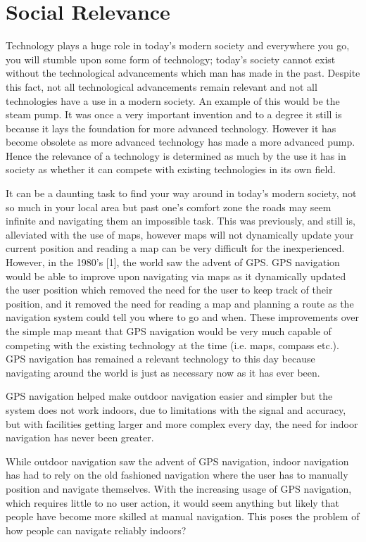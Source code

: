 \section{Social Relevance}
Technology plays a huge role in today's modern society and everywhere you go, you will stumble upon some form of technology; today's society cannot exist without the technological advancements which man has made in the past.
Despite this fact, not all technological advancements remain relevant and not all technologies have a use in a modern society. An example of this would be the steam pump. It was once a very important invention and to a degree it still is because it lays the foundation for more advanced technology. However it has become obsolete as more advanced technology has made a more advanced pump. Hence the relevance of a technology is determined as much by the use it has in society as whether it can compete with existing technologies in its own field.

It can be a daunting task to find your way around in today's modern society, not so much in your local area but past one's comfort zone the roads may seem infinite and navigating them an impossible task. This was previously, and still is, alleviated with the use of maps, however maps will not dynamically update your current position and reading a map can be very difficult for the inexperienced. However, in the 1980's [1], the world saw the advent of GPS. GPS navigation would be able to improve upon navigating via maps as it dynamically updated the user position which removed the need for the user to keep track of their position, and it removed the need for reading a map and planning a route as the navigation system could tell you where to go and when. These improvements over the simple map meant that GPS navigation would be very much capable of competing with the existing technology at the time (i.e. maps, compass etc.). GPS navigation has remained a relevant technology to this day because navigating around the world is just as necessary now as it has ever been.

GPS navigation helped make outdoor navigation easier and simpler but the system does not work indoors, due to limitations with the signal and accuracy, but with facilities getting larger and more complex every day, the need for indoor navigation has never been greater.

While outdoor navigation saw the advent of GPS navigation, indoor navigation has had to rely on the old fashioned navigation where the user has to manually position and navigate themselves. With the increasing usage of GPS navigation, which requires little to no user action, it would seem anything but likely that people have become more skilled at manual navigation. This poses the problem of how people can navigate reliably indoors?

